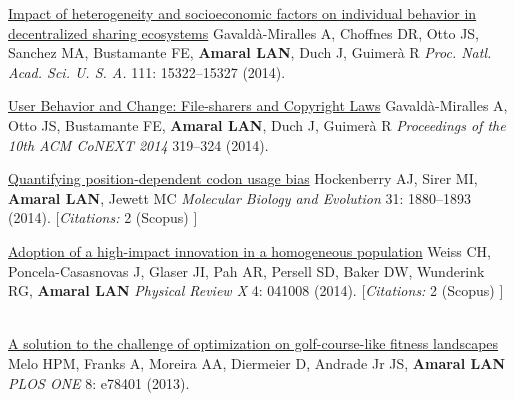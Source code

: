 \NumberedItem{\makebox[0.8cm][r]{[107]}}
\href{/people/amaral/impact-heterogeneity-and-socioeconomic-factors-individual-behavior-decentralized-sharing-ecosystems}
{Impact of heterogeneity and socioeconomic factors on individual behavior in decentralized sharing ecosystems}
\newline
Gavald\`a-Miralles A, Choffnes DR, Otto JS, Sanchez MA, Bustamante FE, {\textbf{Amaral LAN}}, Duch J, Guimer\`a R
\newline
\textit{Proc. Natl. Acad. Sci. U. S. A.}
    111:
15322--15327 (2014).
\newline
\Gap
~
\Gap

\NumberedItem{\makebox[0.8cm][r]{[106]}}
\href{/people/amaral/user-behavior-and-change-file-sharers-and-copyright-laws}
{User Behavior and Change: File-sharers and Copyright Laws}
\newline
Gavald\`a-Miralles A, Otto JS, Bustamante FE, {\textbf{Amaral LAN}}, Duch J, Guimer\`a R
\newline
\textit{Proceedings of the 10th ACM CoNEXT 2014}
319--324 (2014).
\newline
\Gap
~
\Gap

\NumberedItem{\makebox[0.8cm][r]{[105]}}
\href{/people/amaral/quantifying-position-dependent-codon-usage-bias}
{Quantifying position-dependent codon usage bias}
\newline
Hockenberry AJ, Sirer MI, {\textbf{Amaral LAN}}, Jewett MC
\newline
\textit{Molecular Biology and Evolution}
    31:
1880--1893 (2014).
    [{\em{Citations:}}  2 (Scopus) ]
\newline
\Gap
~
\Gap

\NumberedItem{\makebox[0.8cm][r]{[104]}}
\href{/people/amaral/adoption-high-impact-innovation-homogeneous-population}
{Adoption of a high-impact innovation in a homogeneous population}
\newline
Weiss CH, Poncela-Casasnovas J, Glaser JI, Pah AR, Persell SD, Baker DW, Wunderink RG, {\textbf{Amaral LAN}}
\newline
\textit{Physical Review X}
    4:
041008 (2014).
    [{\em{Citations:}}  2 (Scopus) ]
\newline
\Gap
~
\Gap

\NumberedItem{\makebox[0.8cm][r]{[103]}}
\href{/people/amaral/solution_to_challenge}
{A solution to the challenge of optimization on golf-course-like fitness landscapes}
\newline
Melo HPM, Franks A, Moreira AA, Diermeier D, Andrade Jr JS, {\textbf{Amaral LAN}}
\newline
\textit{PLOS ONE}
    8:
e78401 (2013).
\newline
\Gap
~
\Gap

